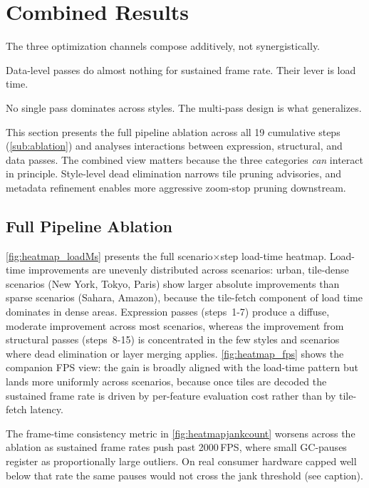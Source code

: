 \section{Combined Results}\label{sec:exp_combined}
\begin{keytakeaways}
\item The three optimization channels compose additively, not synergistically.
\item Data-level passes do almost nothing for sustained frame rate.
Their lever is load time.
\item No single pass dominates across styles.
The multi-pass design is what generalizes.
\end{keytakeaways}

\noindent This section presents the full pipeline ablation across all 19 cumulative steps (\cref{sub:ablation}) and analyses interactions between expression, structural, and data passes.
The combined view matters because the three categories \emph{can} interact in principle.
Style-level dead elimination narrows tile pruning advisories, and metadata refinement enables more aggressive zoom-stop pruning downstream.

\subsection{Full Pipeline Ablation}\label{sub:combined_ablation}

\cref{fig:heatmap_loadMs} presents the full scenario$\times$step load-time heatmap.
Load-time improvements are unevenly distributed across scenarios: urban, tile-dense scenarios (New York, Tokyo, Paris) show larger absolute improvements than sparse scenarios (Sahara, Amazon), because the tile-fetch component of load time dominates in dense areas.
Expression passes (steps~1-7) produce a diffuse, moderate improvement across most scenarios, whereas the improvement from structural passes (steps~8-15) is concentrated in the few styles and scenarios where dead elimination or layer merging applies.
\cref{fig:heatmap_fps} shows the companion \ac{FPS} view: the gain is broadly aligned with the load-time pattern but lands more uniformly across scenarios, because once tiles are decoded the sustained frame rate is driven by per-feature evaluation cost rather than by tile-fetch latency.

The frame-time consistency metric in \cref{fig:heatmapjankcount} worsens across the ablation as sustained frame rates push past 2000\,\ac{FPS}, where small \ac{GC}-pauses register as proportionally large outliers.
On real consumer hardware capped well below that rate the same pauses would not cross the jank threshold (see caption).

